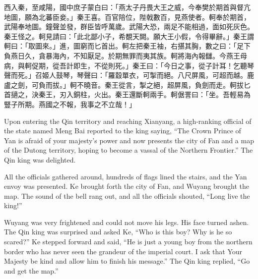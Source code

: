 \documentclass[12pt]{book}
\begin{document}
\Columns
\begin{pairs}
\begin{Rightside}
\begin{chinese}
\beginnumbering
\pstart
西入秦，至咸陽，國中庶子蒙白曰：「燕太子丹畏大王之威，今奉樊於期首與督亢地圖，願為北蕃臣妾。」秦王喜。百官陪位，陛戟數百，見燕使者。軻奉於期首，武陽奉地圖。鐘聲並發，群臣皆呼萬歲。武陽大恐，兩足不能相過，面如死灰色。秦王怪之。軻見請曰：「此北鄙小子，希覩天闕。願大王小假，令得畢辭。」秦王謂軻曰：「取圖來。」進，圖窮而匕首出。軻左把秦王袖，右揕其胸，數之曰：「足下負燕日久，貪暴海內，不知厭足。於期無罪而夷其族。軻將海內報讎。今燕王母病，與軻促期，從吾計即生，不從則死。」秦王曰：「今日之事，從子計耳！乞聽琴聲而死。」召姬人鼓琴，琴聲曰：「羅縠單衣，可掣而絕。八尺屏風，可超而越。鹿盧之劍，可負而拔。」軻不曉音。秦王從言，掣之絕，超屏風，負劍而走。軻拔匕首擿之，決秦王，刃入銅柱，火出。秦王還斷軻兩手。軻倨詈曰：「坐。吾輕易為豎子所期。燕國之不報，我事之不立哉！」
\pend
\endnumbering
\end{chinese}
\end{Rightside}
\begin{Leftside}
\begin{fioesjfsoeifj}
\beginnumbering
\pstart
Upon entering the Qin territory and reaching Xianyang, a high-ranking official of the state named Meng Bai reported to the king saying, ``The Crown Prince of Yan is afraid of your majesty's power and now presents the city of Fan and a map of the Dutong territory, hoping to become a vassal of the Northern Frontier.'' The Qin king was delighted.

All the officials gathered around, hundreds of flags lined the stairs, and the Yan envoy was presented. Ke brought forth the city of Fan, and Wuyang brought the map. The sound of the bell rang out, and all the officials shouted, ``Long live the king!''

Wuyang was very frightened and could not move his legs. His face turned ashen. The Qin king was surprised and asked Ke, ``Who is this boy? Why is he so scared?'' Ke stepped forward and said, ``He is just a young boy from the northern border who has never seen the grandeur of the imperial court. I ask that Your Majesty be kind and allow him to finish his message.'' The Qin king replied, ``Go and get the map.''


\end{fioesjfsoeifj}
\end{Leftside}
\end{pairs}
\end{document}
